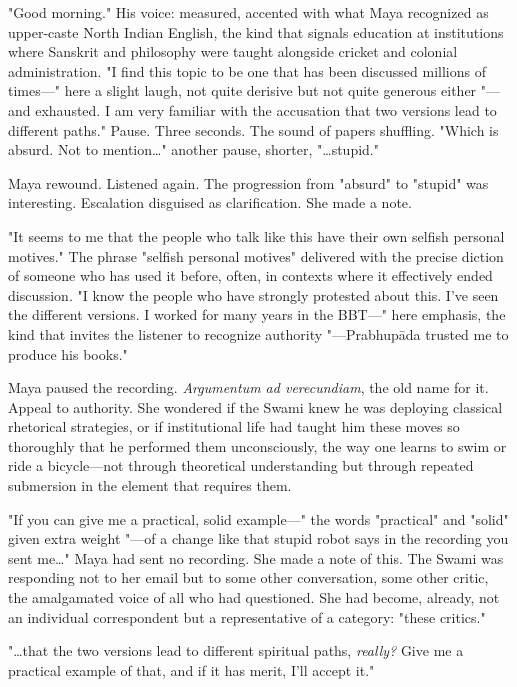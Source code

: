 \documentclass[12pt,twoside]{book}
\begin{document}
"Good morning." His voice: measured, accented with what Maya recognized as upper-caste North Indian English, the kind that signals education at institutions where Sanskrit and philosophy were taught alongside cricket and colonial administration. "I find this topic to be one that has been discussed millions of times—" here a slight laugh, not quite derisive but not quite generous either "—and exhausted. I am very familiar with the accusation that two versions lead to different paths." Pause. Three seconds. The sound of papers shuffling. "Which is absurd. Not to mention\ldots{}" another pause, shorter, "\ldots{}stupid."

Maya rewound. Listened again. The progression from "absurd" to "stupid" was interesting. Escalation disguised as clarification. She made a note.

"It seems to me that the people who talk like this have their own selfish personal motives." The phrase "selfish personal motives" delivered with the precise diction of someone who has used it before, often, in contexts where it effectively ended discussion. "I know the people who have strongly protested about this. I've seen the different versions. I worked for many years in the BBT—" here emphasis, the kind that invites the listener to recognize authority "—Prabhupāda trusted me to produce his books."

Maya paused the recording. \emph{Argumentum ad verecundiam}, the old name for it. Appeal to authority. She wondered if the Swami knew he was deploying classical rhetorical strategies, or if institutional life had taught him these moves so thoroughly that he performed them unconsciously, the way one learns to swim or ride a bicycle—not through theoretical understanding but through repeated submersion in the element that requires them.

"If you can give me a practical, solid example—" the words "practical" and "solid" given extra weight "—of a change like that stupid robot says in the recording you sent me\ldots{}" Maya had sent no recording. She made a note of this. The Swami was responding not to her email but to some other conversation, some other critic, the amalgamated voice of all who had questioned. She had become, already, not an individual correspondent but a representative of a category: "these critics."

"\ldots{}that the two versions lead to different spiritual paths, \emph{really?} Give me a practical example of that, and if it has merit, I'll accept it."
\end{document}
